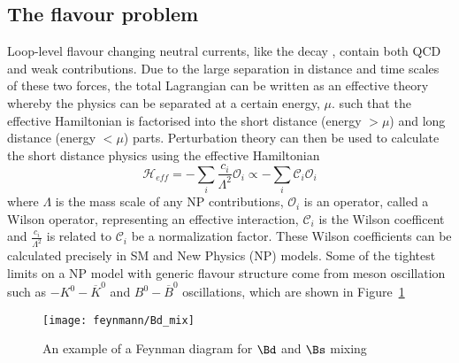 \subsection{The flavour problem}
\label{subsec:mfv}
Loop-level flavour changing neutral currents, like the decay \Lbpi, contain both QCD and weak contributions. Due to the large separation in distance and time scales of these two forces, the total Lagrangian can be written as an effective theory whereby the physics can be separated at a certain energy, $\mu$. such that the effective Hamiltonian is factorised into the short distance (energy $>\mu$) and long distance (energy $<\mu$) parts. Perturbation theory can then be used to calculate the short distance physics using the effective Hamiltonian
\begin{equation}
  \mathcal{H}_{eff} = -\sum_{i}\frac{c_{i}}{\Lambda^{2}}\mathcal{O}_{i} \propto -\sum_{i}\mathcal{C}_{i}\mathcal{O}_{i}
\end{equation}
where $\Lambda$ is the mass scale of any NP contributions, $\mathcal{O}_{i}$ is an operator, called a Wilson operator, representing an effective interaction, $\mathcal{C}_{i}$ is the Wilson coefficent and $\frac{c_{i}}{\Lambda^{2}}$ is related to $\mathcal{C}_{i}$ be a normalization factor.
These Wilson coefficients can be calculated precisely in SM and New Physics (NP) models. Some of the tightest limits on a NP model with generic flavour structure come from meson oscillation such as $-K^{0} - \overline{K}^{0}$ and $B^{0} - \overline{B}^{0}$ oscillations, which are shown in Figure~\ref{fig:Bdmix}
\begin{figure}[!h]\def\nh{0.5\textwidth}
  \centering
  \texttt{[image: feynmann/Bd\_mix]}
  \caption{An example of a Feynman diagram for $\Bd$ and $\Bs$ mixing}
  \label{fig:Bdmix}
\end{figure}

